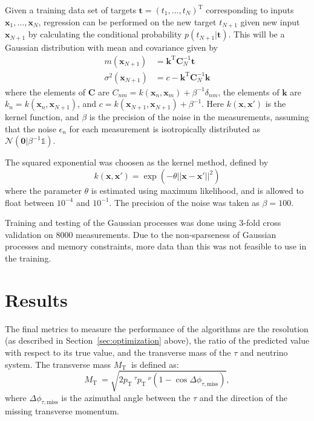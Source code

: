 \documentclass{scrartcl}
\newcommand{\pt}{\ensuremath{p_\text{T}}~}
\newcommand{\mt}{\ensuremath{M_\text{T}}~}
\begin{document}
Given a training data set of targets $\mathbf t = (t_1,\ldots,t_N)^\text{T}$ corresponding to inputs $\mathbf x_1,\ldots,\mathbf x_N$, regression can be performed on the new target $t_{N+1}$ given new input $\mathbf x_{N+1}$ by calculating the conditional probability $p(t_{N+1}|\mathbf t)$. This will be a Gaussian distribution with mean and covariance given by
\begin{align}
    m(\mathbf x_{N+1}) &= \mathbf k^\text{T} \mathbf C^{-1}_N \mathbf t \\
    \sigma^2(\mathbf x_{N+1}) &= c - \mathbf k^\text{T} \mathbf C^{-1}_N \mathbf k
\end{align}
where the elements of $\mathbf C$ are $C_{nm} = k(\mathbf x_n, \mathbf x_m) + \beta^{-1}\delta_{nm}$, the elements of $\mathbf k$ are $k_n = k(\mathbf x_n, \mathbf x_{N+1})$, and $c = k(\mathbf x_{N+1}, \mathbf x_{N+1}) + \beta^{-1}$. Here $k(\mathbf x, \mathbf x')$ is the kernel function, and $\beta$ is the precision of the noise in the measurements, assuming that the noise $\epsilon_n$ for each measurement is isotropically distributed as $\mathcal N(\mathbf 0 | \beta^{-1}\mathbb 1)$.

The squared exponential was choosen as the kernel method, defined by
\begin{equation}
    k(\mathbf x, \mathbf x') = \exp( -\theta ||\mathbf x - \mathbf x'||^2 )
\end{equation}
where the parameter $\theta$ is estimated using maximum likelihood, and is allowed to float between $10^{-4}$ and $10^{-1}$. The precision of the noise was taken as $\beta = 100$. 

Training and testing of the Gaussian processes was done using 3-fold cross validation on 8000 measurements. Due to the non-sparseness of Gaussian processes and memory constraints, more data than this was not feasible to use in the training.
\section{Results}
\label{sec:results}

The final metrics to measure the performance of the algorithms are the resolution (as described in Section~\ref{sec:optimization} above), the ratio of the predicted value with respect to its true value, and the transverse mass of the $τ$ and neutrino system. The transverse mass $\mt$ is defined as:
\begin{equation}
  \label{eq:mt}
  \mt=\sqrt{ 2 \pt^\tau \pt^\nu   (1-\cos \Delta\phi_{\tau,\text{miss}}) },
\end{equation}
where $\Delta\phi_{\tau,\text{miss}}$ is the azimuthal angle between the $\tau$ and the direction of the missing transverse momentum. 
\end{document}
